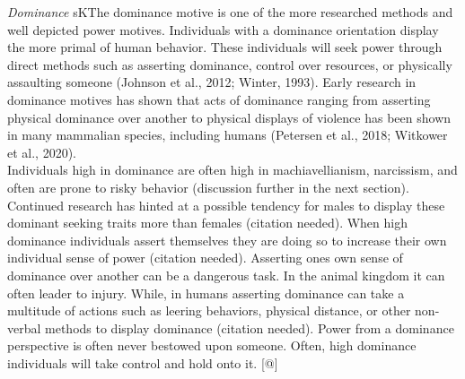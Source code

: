 \documentclass[
  english,
  a4paper]{apa7}
\begin{document}
\emph{Dominance}
sKThe dominance motive is one of the more researched methods and well depicted power motives. Individuals with a dominance orientation display the more primal of human behavior. These individuals will seek power through direct methods such as asserting dominance, control over resources, or physically assaulting someone (Johnson et al., 2012; Winter, 1993). Early research in dominance motives has shown that acts of dominance ranging from asserting physical dominance over another to physical displays of violence has been shown in many mammalian species, including humans (Petersen et al., 2018; Witkower et al., 2020).\\
Individuals high in dominance are often high in machiavellianism, narcissism, and often are prone to risky behavior (discussion further in the next section). Continued research has hinted at a possible tendency for males to display these dominant seeking traits more than females (citation needed). When high dominance individuals assert themselves they are doing so to increase their own individual sense of power (citation needed). Asserting ones own sense of dominance over another can be a dangerous task. In the animal kingdom it can often leader to injury. While, in humans asserting dominance can take a multitude of actions such as leering behaviors, physical distance, or other non-verbal methods to display dominance (citation needed). Power from a dominance perspective is often never bestowed upon someone. Often, high dominance individuals will take control and hold onto it. {[}@{]}
\end{document}
